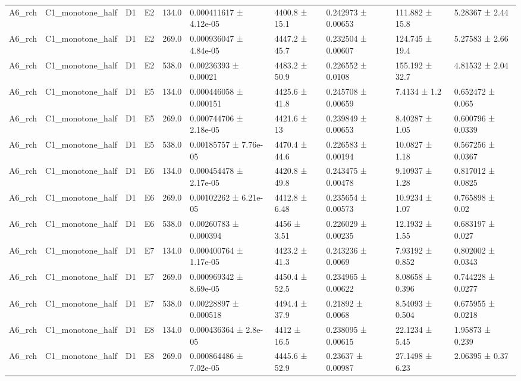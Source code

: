 \begin{table}
\begin{tabular}{llllllllll}
A6\_rch & C1\_monotone\_half & D1 & E2 & 134.0 & 0.000411617 ± 4.12e-05 & 4400.8 ± 15.1 & 0.242973 ± 0.00653 & 111.882 ± 15.8 & 5.28367 ± 2.44 \\
A6\_rch & C1\_monotone\_half & D1 & E2 & 269.0 & 0.000936047 ± 4.84e-05 & 4447.2 ± 45.7 & 0.232504 ± 0.00607 & 124.745 ± 19.4 & 5.27583 ± 2.66 \\
A6\_rch & C1\_monotone\_half & D1 & E2 & 538.0 & 0.00236393 ± 0.00021 & 4483.2 ± 50.9 & 0.226552 ± 0.0108 & 155.192 ± 32.7 & 4.81532 ± 2.04 \\
A6\_rch & C1\_monotone\_half & D1 & E5 & 134.0 & 0.000446058 ± 0.000151 & 4425.6 ± 41.8 & 0.245708 ± 0.00659 & 7.4134 ± 1.2 & 0.652472 ± 0.065 \\
A6\_rch & C1\_monotone\_half & D1 & E5 & 269.0 & 0.000744706 ± 2.18e-05 & 4421.6 ± 13 & 0.239849 ± 0.00653 & 8.40287 ± 1.05 & 0.600796 ± 0.0339 \\
A6\_rch & C1\_monotone\_half & D1 & E5 & 538.0 & 0.00185757 ± 7.76e-05 & 4470.4 ± 44.6 & 0.226583 ± 0.00194 & 10.0827 ± 1.18 & 0.567256 ± 0.0367 \\
A6\_rch & C1\_monotone\_half & D1 & E6 & 134.0 & 0.000454478 ± 2.17e-05 & 4420.8 ± 49.8 & 0.243475 ± 0.00478 & 9.10937 ± 1.28 & 0.817012 ± 0.0825 \\
A6\_rch & C1\_monotone\_half & D1 & E6 & 269.0 & 0.00102262 ± 6.21e-05 & 4412.8 ± 6.48 & 0.235654 ± 0.00573 & 10.9234 ± 1.07 & 0.765898 ± 0.02 \\
A6\_rch & C1\_monotone\_half & D1 & E6 & 538.0 & 0.00260783 ± 0.000394 & 4456 ± 3.51 & 0.226029 ± 0.00235 & 12.1932 ± 1.55 & 0.683197 ± 0.027 \\
A6\_rch & C1\_monotone\_half & D1 & E7 & 134.0 & 0.000400764 ± 1.17e-05 & 4423.2 ± 41.3 & 0.243236 ± 0.0069 & 7.93192 ± 0.852 & 0.802002 ± 0.0343 \\
A6\_rch & C1\_monotone\_half & D1 & E7 & 269.0 & 0.000969342 ± 8.69e-05 & 4450.4 ± 52.5 & 0.234965 ± 0.00622 & 8.08658 ± 0.396 & 0.744228 ± 0.0277 \\
A6\_rch & C1\_monotone\_half & D1 & E7 & 538.0 & 0.00228897 ± 0.000518 & 4494.4 ± 37.9 & 0.21892 ± 0.0068 & 8.54093 ± 0.504 & 0.675955 ± 0.0218 \\
A6\_rch & C1\_monotone\_half & D1 & E8 & 134.0 & 0.000436364 ± 2.8e-05 & 4412 ± 16.5 & 0.238095 ± 0.00615 & 22.1234 ± 5.45 & 1.95873 ± 0.239 \\
A6\_rch & C1\_monotone\_half & D1 & E8 & 269.0 & 0.000864486 ± 7.02e-05 & 4445.6 ± 52.9 & 0.23637 ± 0.00987 & 27.1498 ± 6.23 & 2.06395 ± 0.37 \\

\end{tabular}
\end{table}
